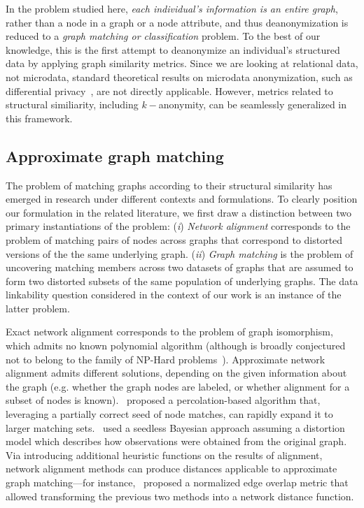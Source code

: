 In the problem studied here, \emph{each individual's information is an entire graph}, rather than a node in a graph or a node attribute, and thus deanonymization is reduced to a \emph{graph matching or classification} problem.
To the best of our knowledge, this is the first attempt to deanonymize an individual's structured data by applying graph similarity metrics.
Since we are looking at relational data, not microdata, standard theoretical results on microdata anonymization, such as differential privacy~\citep{dwork2006calibrating}, are not directly applicable.
However, metrics related to structural similiarity, including $k-$anonymity, can be seamlessly generalized in this framework.

\subsection{Approximate graph matching}
The problem of matching graphs according to their structural similarity has emerged in research under different contexts and formulations. To clearly position our formulation in the related literature, we first draw a distinction between two primary instantiations of the problem: (\emph{i}) \emph{Network alignment} corresponds to the problem of matching pairs of nodes across graphs that correspond to distorted versions of the the same underlying graph. (\emph{ii}) \emph{Graph matching} is the problem of uncovering matching members across two datasets of graphs that are assumed to form two distorted subsets of the same population of underlying graphs. The data linkability question considered in the context of our work is an instance of the latter problem.

Exact network alignment corresponds to the problem of graph isomorphism, which admits no known polynomial algorithm (although is broadly conjectured not to belong to the family of NP-Hard problems~\citep{schoening88}). Approximate network alignment admits different solutions, depending on the given information about the graph (e.g. whether the graph nodes are labeled, or whether alignment for a subset of nodes is known).~\textcite{kazemi15} proposed a percolation-based algorithm that, leveraging a partially correct seed of node matches, can rapidly expand it to larger matching sets.~\textcite{pedarsani13} used a seedless Bayesian approach assuming a distortion model which describes how observations were obtained from the original graph. Via introducing additional heuristic functions on the results of alignment, network alignment methods can produce distances applicable to approximate graph matching---for instance,~\textcite{mishinev20} proposed a normalized edge overlap metric that allowed transforming the previous two methods into a network distance function.

